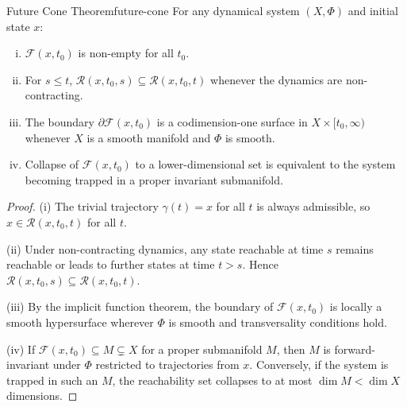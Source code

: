 \documentclass[12pt,twoside,openright]{book}
\newcommand{\reach}{\mathcal{R}}
\begin{document}
\begin{theorem}{Future Cone Theorem}{future-cone}
  For any dynamical system $(X,\Phi)$ and initial state $x$:
  \begin{enumerate}[(i)]
    \item $\mathcal{F}(x,t_0)$ is non-empty for all $t_0$.
    \item For $s\le t$, $\reach(x,t_0,s) \subseteq
          \reach(x,t_0,t)$ whenever the dynamics are
          non-contracting.
    \item The boundary $\partial\mathcal{F}(x,t_0)$ is a
          codimension-one surface in
          $X\times[t_0,\infty)$ whenever $X$ is a smooth
          manifold and $\Phi$ is smooth.
    \item Collapse of $\mathcal{F}(x,t_0)$ to a
          lower-dimensional set is equivalent to the system
          becoming trapped in a proper invariant
          submanifold.
  \end{enumerate}
\end{theorem}

\begin{proof}
  (i) The trivial trajectory $\gamma(t)=x$ for all $t$ is
  always admissible, so $x\in\reach(x,t_0,t)$ for all $t$.

  (ii) Under non-contracting dynamics, any state reachable
  at time $s$ remains reachable or leads to further states
  at time $t>s$. Hence
  $\reach(x,t_0,s)\subseteq\reach(x,t_0,t)$.

  (iii) By the implicit function theorem, the boundary of
  $\mathcal{F}(x,t_0)$ is locally a smooth hypersurface
  wherever $\Phi$ is smooth and transversality conditions
  hold.

  (iv) If $\mathcal{F}(x,t_0)\subseteq M \subsetneq X$ for a
  proper submanifold $M$, then $M$ is forward-invariant
  under $\Phi$ restricted to trajectories from $x$.
  Conversely, if the system is trapped in such an $M$, the
  reachability set collapses to at most $\dim M < \dim X$
  dimensions.
\end{proof}
\end{document}
